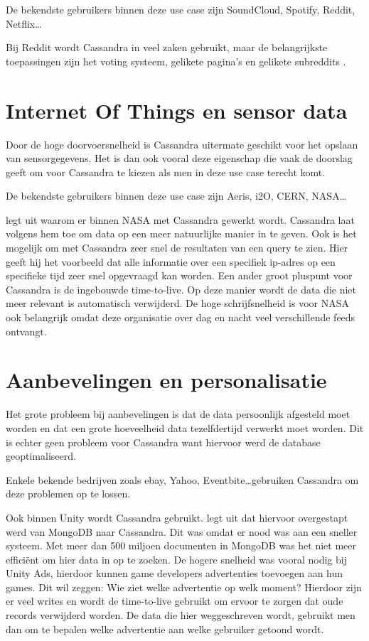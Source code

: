 De bekendste gebruikers binnen deze use case zijn SoundCloud, Spotify, Reddit, Netflix\dots

Bij Reddit wordt Cassandra in veel zaken gebruikt, maar de belangrijkste toepassingen zijn het voting systeem, gelikete pagina's en gelikete subreddits \citep{Harvey2013Reddit}.

\section{Internet Of Things en sensor data}
Door de hoge doorvoersnelheid is Cassandra uitermate geschikt voor het opslaan van sensorgegevens.
Het is dan ook vooral deze eigenschap die vaak de doorslag geeft om voor Cassandra te kiezen als men in deze use case terecht komt.

De bekendste gebruikers binnen deze use case zijn Aeris, i2O, CERN, NASA\dots

\cite{Keller2013Nasa} legt uit waarom er binnen NASA met Cassandra gewerkt wordt.
Cassandra laat volgens hem toe om data op een meer natuurlijke manier in te geven.
Ook is het mogelijk om met Cassandra zeer snel de resultaten van een query te zien.
Hier geeft hij het voorbeeld dat alle informatie over een specifiek ip-adres op een specifieke tijd zeer snel opgevraagd kan worden.
Een ander groot pluspunt voor Cassandra is de ingebouwde time-to-live.
Op deze manier wordt de data die niet meer relevant is automatisch verwijderd.
De hoge schrijfsnelheid is voor NASA ook belangrijk omdat deze organisatie over dag en nacht veel verschillende feeds ontvangt.

\section{Aanbevelingen en personalisatie}
Het grote probleem bij aanbevelingen is dat de data persoonlijk afgesteld moet worden en dat een grote hoeveelheid data tezelfdertijd verwerkt moet worden.
Dit is echter geen probleem voor Cassandra want hiervoor werd de database geoptimaliseerd.

Enkele bekende bedrijven zoals ebay, Yahoo, Eventbite\dots  gebruiken Cassandra om deze problemen op te lossen.

Ook binnen Unity wordt Cassandra gebruikt.
\cite{Makinen2015Cassandra} legt uit dat hiervoor overgestapt werd van MongoDB naar Cassandra.
Dit was omdat er nood was aan een sneller systeem.
Met meer dan 500 miljoen documenten in MongoDB was het niet meer efficiënt om hier data in op te zoeken.
De hogere snelheid was vooral nodig bij Unity Ads, hierdoor kunnen game developers advertenties toevoegen aan hun games.
Dit wil zeggen: Wie ziet welke advertentie op welk moment?
Hierdoor zijn er veel writes en wordt de time-to-live gebruikt om ervoor te zorgen dat oude records verwijderd worden.
De data die hier weggeschreven wordt, gebruikt men dan om te bepalen welke advertentie aan welke gebruiker getoond wordt.

